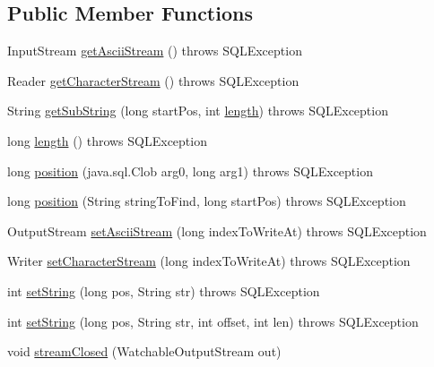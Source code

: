 \subsection*{Public Member Functions}
\begin{DoxyCompactItemize}
\item 
Input\+Stream \mbox{\hyperlink{classcom_1_1mysql_1_1jdbc_1_1_clob_a26b535e118f453c6524ef55fa26a2218}{get\+Ascii\+Stream}} ()  throws S\+Q\+L\+Exception 
\item 
Reader \mbox{\hyperlink{classcom_1_1mysql_1_1jdbc_1_1_clob_abad22d4373aa8e404953be02f63db1fa}{get\+Character\+Stream}} ()  throws S\+Q\+L\+Exception 
\item 
String \mbox{\hyperlink{classcom_1_1mysql_1_1jdbc_1_1_clob_a307a0f6842fe4db4f8753a61f5ae612c}{get\+Sub\+String}} (long start\+Pos, int \mbox{\hyperlink{classcom_1_1mysql_1_1jdbc_1_1_clob_ac337421e5371c5ecafcffbfd75103a5d}{length}})  throws S\+Q\+L\+Exception 
\item 
long \mbox{\hyperlink{classcom_1_1mysql_1_1jdbc_1_1_clob_ac337421e5371c5ecafcffbfd75103a5d}{length}} ()  throws S\+Q\+L\+Exception 
\item 
long \mbox{\hyperlink{classcom_1_1mysql_1_1jdbc_1_1_clob_a53c58ed415a8c742e66343d762219b80}{position}} (java.\+sql.\+Clob arg0, long arg1)  throws S\+Q\+L\+Exception 
\item 
long \mbox{\hyperlink{classcom_1_1mysql_1_1jdbc_1_1_clob_a7268e3140533003e4a4688da0abfe9e3}{position}} (String string\+To\+Find, long start\+Pos)  throws S\+Q\+L\+Exception 
\item 
Output\+Stream \mbox{\hyperlink{classcom_1_1mysql_1_1jdbc_1_1_clob_a9c7635d9d09a1693f072576a818fca24}{set\+Ascii\+Stream}} (long index\+To\+Write\+At)  throws S\+Q\+L\+Exception 
\item 
Writer \mbox{\hyperlink{classcom_1_1mysql_1_1jdbc_1_1_clob_a22d27bf737bec9eae054c624955c767f}{set\+Character\+Stream}} (long index\+To\+Write\+At)  throws S\+Q\+L\+Exception 
\item 
int \mbox{\hyperlink{classcom_1_1mysql_1_1jdbc_1_1_clob_a6f6ca788351e6699886a355b49c0a583}{set\+String}} (long pos, String str)  throws S\+Q\+L\+Exception 
\item 
int \mbox{\hyperlink{classcom_1_1mysql_1_1jdbc_1_1_clob_a6cee59292b60d8e788a9218940284154}{set\+String}} (long pos, String str, int offset, int len)  throws S\+Q\+L\+Exception 
\item 
void \mbox{\hyperlink{classcom_1_1mysql_1_1jdbc_1_1_clob_a70ec18cf9f17467e40d95a64db72866e}{stream\+Closed}} (Watchable\+Output\+Stream out)

\end{DoxyCompactItemize}
